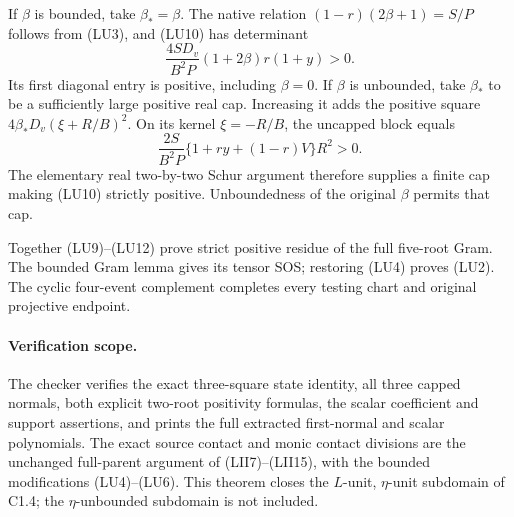 If $\beta$ is bounded, take $\beta_*=\beta$.  The native relation
$(1-r)(2\beta+1)=S/P$ follows from (LU3), and (LU10) has determinant
\[
 \frac{4S D_v}{B^2P}(1+2\beta)r(1+y)>0.                 \tag{LU11}
\]
Its first diagonal entry is positive, including $\beta=0$.
If $\beta$ is unbounded, take $\beta_*$ to be a sufficiently large
positive real cap.  Increasing it adds the positive square
$4\beta_*D_v(\xi+R/B)^2$.  On its kernel $\xi=-R/B$,
the uncapped block equals
\[
          \frac{2S}{B^2P}\{1+ry+(1-r)V\}R^2>0.           \tag{LU12}
\]
The elementary real two-by-two Schur argument therefore supplies
a finite cap making (LU10) strictly positive.  Unboundedness of the
original $\beta$ permits that cap.

Together (LU9)--(LU12) prove strict positive residue of the full
five-root Gram.  The bounded Gram lemma gives its tensor SOS;
restoring (LU4) proves (LU2).  The cyclic four-event complement
completes every testing chart and original projective endpoint.

\paragraph{Verification scope.}
The checker verifies the exact three-square state identity, all three
capped normals, both explicit two-root positivity formulas, the scalar
coefficient and support assertions, and prints the full extracted
first-normal and scalar polynomials.  The exact source contact and
monic contact divisions are the unchanged full-parent argument of
(LII7)--(LII15), with the bounded modifications (LU4)--(LU6).
This theorem closes the $L$-unit, $\eta$-unit subdomain of C1.4;
the $\eta$-unbounded subdomain is not included.
